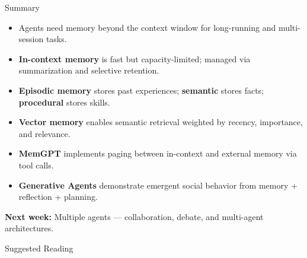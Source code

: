 \documentclass[aspectratio=169,10pt]{beamer}
\begin{document}
\begin{frame}{Summary}
  \begin{itemize}
    \item Agents need memory beyond the context window for long-running and multi-session tasks.
    \item \textbf{In-context memory} is fast but capacity-limited; managed via summarization and selective retention.
    \item \textbf{Episodic memory} stores past experiences; \textbf{semantic} stores facts; \textbf{procedural} stores skills.
    \item \textbf{Vector memory} enables semantic retrieval weighted by recency, importance, and relevance.
    \item \textbf{MemGPT} implements paging between in-context and external memory via tool calls.
    \item \textbf{Generative Agents} demonstrate emergent social behavior from memory + reflection + planning.
  \end{itemize}
  \vspace{0.3em}
  \textbf{Next week:} Multiple agents — collaboration, debate, and multi-agent architectures.
\end{frame}

\begin{frame}[allowframebreaks]{Suggested Reading}
  \nocite{park2023generative, packer2023memgpt}
  
\end{frame}
\end{document}
